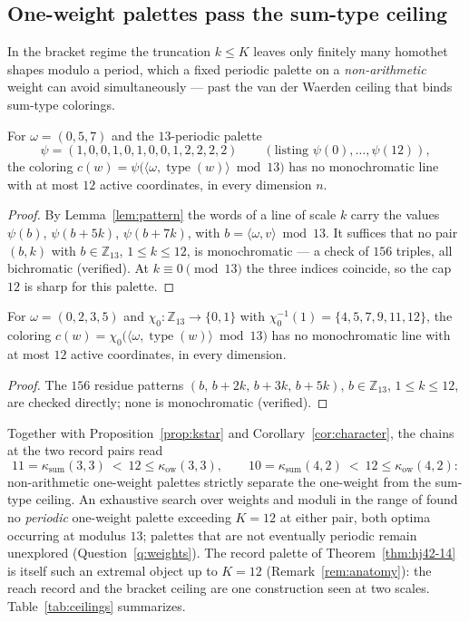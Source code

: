\documentclass[12pt]{article}
\newcommand{\HJ}{\mathrm{HJ}}
\newcommand{\Z}{\mathbb{Z}}
\newcommand{\ksum}{\kappa_{\mathrm{sum}}}
\newcommand{\kow}{\kappa_{\mathrm{ow}}}
\DeclareMathOperator{\type}{type}
\begin{document}
\subsection{One-weight palettes pass the sum-type ceiling}\label{sec:ow-bracket}

In the bracket regime the truncation $k\le K$ leaves only finitely many
homothet shapes modulo a period, which a fixed periodic palette on a
\emph{non-arithmetic} weight can avoid simultaneously --- past the van
der Waerden ceiling that binds sum-type colorings.

\begin{theorem}[$\HJ^{[12]}(3,3)=\infty$; computer-verified]\label{thm:hj12-33}
For $\omega=(0,5,7)$ and the $13$-periodic palette
\[
\psi=(1,0,0,1,0,1,0,0,1,2,2,2,2)
\qquad(\text{listing }\psi(0),\dots,\psi(12)),
\]
the coloring $c(w)=\psi\bigl(\langle\omega,\type(w)\rangle\bmod 13\bigr)$
has no monochromatic line with at most $12$ active coordinates, in every
dimension $n$.
\end{theorem}

\begin{proof}
By Lemma~\ref{lem:pattern} the words of a line of scale $k$ carry the
values $\psi(b)$, $\psi(b{+}5k)$, $\psi(b{+}7k)$, with
$b=\langle\omega,v\rangle\bmod 13$. It suffices that no pair $(b,k)$
with $b\in\Z_{13}$, $1\le k\le 12$, is monochromatic --- a check of
$156$ triples, all bichromatic (verified). At $k\equiv 0\pmod{13}$ the
three indices coincide, so the cap $12$ is sharp for this palette.
\end{proof}

\begin{theorem}[$\HJ^{[12]}(4,2)=\infty$; computer-verified]\label{thm:hj12-42}
For $\omega=(0,2,3,5)$ and $\chi_{0}\colon\Z_{13}\to\{0,1\}$ with
$\chi_{0}^{-1}(1)=\{4,5,7,9,11,12\}$, the coloring
$c(w)=\chi_{0}\bigl(\langle\omega,\type(w)\rangle\bmod 13\bigr)$ has no
monochromatic line with at most $12$ active coordinates, in every
dimension.
\end{theorem}

\begin{proof}
The $156$ residue patterns $(b,\,b{+}2k,\,b{+}3k,\,b{+}5k)$,
$b\in\Z_{13}$, $1\le k\le 12$, are checked directly; none is
monochromatic (verified).
\end{proof}

Together with Proposition~\ref{prop:kstar} and
Corollary~\ref{cor:character}, the chains at the two record pairs read
\[
11=\ksum(3,3)\ <\ 12\le\kow(3,3),
\qquad
10=\ksum(4,2)\ <\ 12\le\kow(4,2):
\]
non-arithmetic one-weight palettes strictly separate the one-weight
from the sum-type ceiling. An exhaustive search over weights and moduli
in the range of \cite{thesis} found no \emph{periodic} one-weight
palette exceeding $K=12$ at either pair, both optima occurring at
modulus $13$; palettes that are not eventually periodic remain
unexplored (Question~\ref{q:weights}). The record palette of
Theorem~\ref{thm:hj42-14} is itself such an extremal object up to
$K=12$ (Remark~\ref{rem:anatomy}): the reach record and the bracket
ceiling are one construction seen at two scales.
Table~\ref{tab:ceilings} summarizes.
\end{document}
